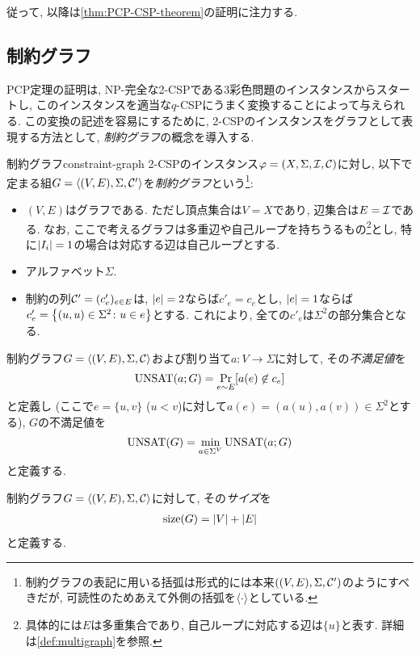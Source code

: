 従って, 以降は\cref{thm:PCP-CSP-theorem}の証明に注力する.

\subsection{制約グラフ}
PCP定理の証明は, NP-完全な2-CSPである3彩色問題のインスタンスからスタートし,
このインスタンスを適当な$q$-CSPにうまく変換することによって与えられる.
この変換の記述を容易にするために, 2-CSPのインスタンスをグラフとして表現する方法として, \emph{制約グラフ}の概念を導入する.

\begin{definition}{制約グラフ}{constraint-graph}
  2-CSPのインスタンス$\varphi=(X,\Sigma,\mathcal{I},\mathcal{C})$に対し, 以下で定まる組$G=\langle(V,E),\Sigma,\mathcal{C}'\rangle$を\emph{制約グラフ}という\footnote{制約グラフの表記に用いる括弧は形式的には本来$((V,E),\Sigma,\mathcal{C}')$のようにすべきだが, 可読性のためあえて外側の括弧を$\langle\cdot\rangle$としている.}:
  \begin{itemize}
    \item $(V,E)$はグラフである. ただし頂点集合は$V=X$であり, 辺集合は$E=\mathcal{I}$である. なお, ここで考えるグラフは多重辺や自己ループを持ちうるもの\footnote{具体的には$E$は多重集合であり, 自己ループに対応する辺は$\{u\}$と表す. 詳細は\cref{def:multigraph}を参照.}とし, 特に$\abs{I_i}=1$の場合は対応する辺は自己ループとする.
    \item アルファベット$\Sigma$.
    \item 制約の列$\mathcal{C}'=(c'_e)_{e\in E}$は, $\abs{e}=2$ならば$c'_e=c_e$とし, $\abs{e}=1$ならば$c'_e=\qty{ (u,u) \in \Sigma^2 \colon u\in e }$とする. これにより, 全ての$c'_e$は$\Sigma^2$の部分集合となる.
  \end{itemize}

  制約グラフ$G=\langle(V,E),\Sigma,\mathcal{C}\rangle$および割り当て$a\colon V\to \Sigma$に対して, その\emph{不満足値}を
  \begin{align*}
    \mathrm{UNSAT}(a;G) = \Pr_{e\sim E}[a(e) \not\in c_e]
  \end{align*}
  と定義し (ここで$e=\{u,v\}$ ($u<v$)に対して$a(e)=(a(u),a(v))\in\Sigma^2$とする), $G$の不満足値を
  \begin{align*}
    \mathrm{UNSAT}(G) = \min_{a\in\Sigma^V} \mathrm{UNSAT}(a;G)
  \end{align*}
  と定義する.

  制約グラフ$G=\langle(V,E),\Sigma,\mathcal{C}\rangle$に対して, その\emph{サイズ}を
  \begin{align*}
    \mathrm{size}(G) = \abs{V} + \abs{E}
  \end{align*}
  と定義する.
\end{definition}

